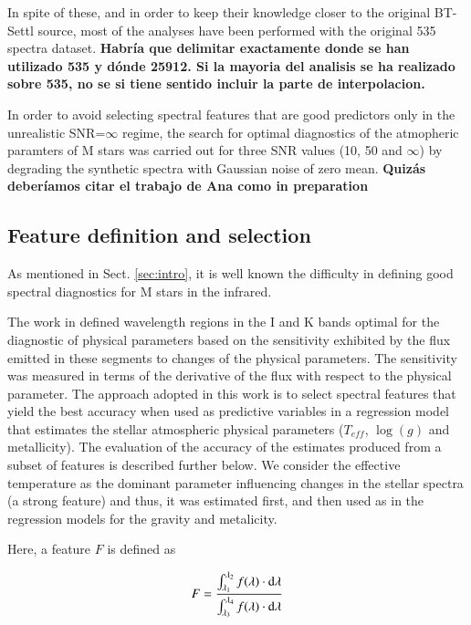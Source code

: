 {{{In spite of these, and in order to keep their knowledge closer to the
original BT-Settl source, most of the analyses have been performed
with the original 535 spectra dataset.  }{\bf Habría que delimitar
exactamente donde se han utilizado 535 y dónde 25912. Si la mayoria
del analisis se ha realizado sobre 535, no se si tiene sentido incluir
la parte de interpolacion.}


{ In order to avoid selecting spectral features that are good
  predictors only in the unrealistic SNR=$\infty$ regime, the search
  for optimal diagnostics of the atmopheric paramters of M stars was
  carried out for three SNR values (10, 50 and $\infty$) by degrading
  the synthetic spectra with Gaussian noise of zero mean.  {\bf Quizás
  deberíamos citar el trabajo de Ana como in preparation} }

\subsection{Feature definition and selection}
\label{subsec:FD}
{ As mentioned in Sect. \ref{sec:intro}, it is well known the
difficulty in defining good spectral diagnostics for M stars in the
infrared.}

{The work in \cite{2013A&A...549A.129C} defined wavelength regions in
the I and K bands optimal for the diagnostic of physical parameters
based on the sensitivity exhibited by the flux emitted in these
segments to changes of the physical parameters. The sensitivity was
measured in terms of the derivative of the flux with respect to the
physical parameter. The approach adopted in this work is to select
spectral features that yield the best accuracy when used as predictive
variables in a regression model that estimates the stellar atmospheric
physical parameters ($T_{eff}$, $\log(g)$ and metallicity). The
evaluation of the accuracy of the estimates produced from a subset of
features is described further below. We consider the effective
temperature as the dominant parameter influencing changes in the
stellar spectra (a strong feature) and thus, it was estimated first,
and then used as in the regression models for the gravity and
metalicity.}

Here, a feature $F$ is defined as

\begin{equation}\label{eq:feature}
  F = \frac{ \int_{\lambda_{1}}^{\lambda_{2}}f(\lambda) \cdot {\rm d}{\lambda}}
               {\int_{\lambda_{3}}^{\lambda_{4}} f(\lambda) \cdot {\rm d}{\lambda}} 
\end{equation}

}}

